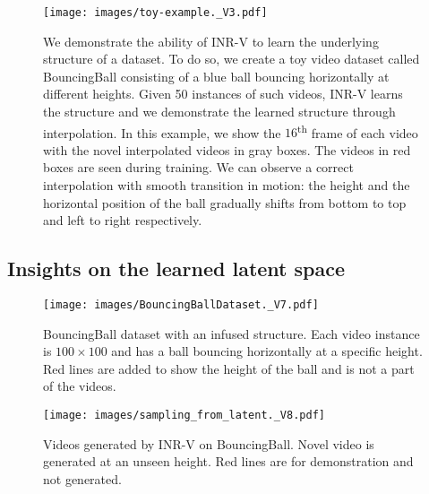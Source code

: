\documentclass[10pt]{article} \usepackage[accepted]{tmlr}
\begin{document}
\begin{figure}[]
  \centering
  \texttt{[image: images/toy-example.\_V3.pdf]}
  \caption{\small We demonstrate the ability of INR-V to learn the underlying structure of a dataset. To do so, we create a toy video dataset called BouncingBall consisting of a blue ball bouncing horizontally at different heights.
  Given 50 instances of such videos, INR-V learns the structure and we demonstrate the learned structure through interpolation. In this example, we show the $16$\textsuperscript{th} frame of each video with the novel interpolated videos in gray boxes. The videos in red boxes are seen during training. We can observe a correct interpolation with smooth transition in motion: the height and the horizontal position of the ball gradually shifts from bottom to top and left to right respectively.}
  \label{fig:toyexampleinterpolation}
\end{figure}


\subsection{Insights on the learned latent space}
\label{sec:insights-appendix}



\begin{wrapfigure}[29]{R}{0.32\textwidth}
    \centering
    \vspace{-10pt}
    \texttt{[image: images/BouncingBallDataset.\_V7.pdf]}
    \caption{BouncingBall dataset with an infused structure. Each video instance is $100 \times 100$ and has a ball bouncing horizontally at a specific height. Red lines are added to show the height of the ball and is not a part of the videos.}
    \label{fig:bouncingballsdatset}
    \vspace{1.2em}    \texttt{[image: images/sampling\_from\_latent.\_V8.pdf]}
    \caption{Videos generated by INR-V on BouncingBall. Novel video is generated at an unseen height. Red lines are for demonstration and not generated.}
    \label{fig:bouncingballs_sample}
  
\end{wrapfigure}
\end{document}
